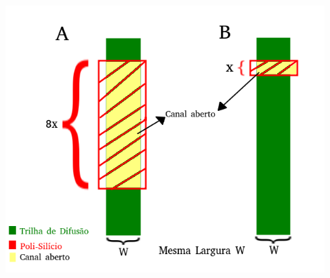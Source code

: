 \documentclass[12pt]{article}
\begin{document}
\begin{itemize}
			\hfill \\
			\includegraphics[width=12cm]{questao_4.png}
	\end{itemize}
\end{document}
